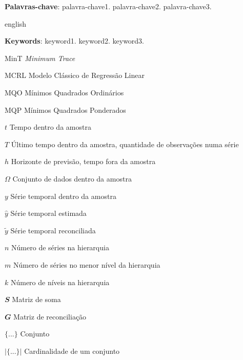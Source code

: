 
\setlength{\absparsep}{18pt}
\begin{resumo}
  \lipsum[30]

  \textbf{Palavras-chave}: palavra-chave1. palavra-chave2. palavra-chave3.
\end{resumo}

\begin{resumo}[Abstract]
  \begin{otherlanguage*}{english}
    \lipsum[30]

    \vspace{\onelineskip}
 
    \noindent 
    \textbf{Keywords}: keyword1. keyword2. keyword3.
  \end{otherlanguage*}
\end{resumo}

\listoffigures*
\cleardoublepage

\listofquadros*
\cleardoublepage

\listoftables*
\cleardoublepage

\begin{siglas}
  \item[MinT] \textit{Minimum Trace}
  \item[MCRL] Modelo Clássico de Regressão Linear
  \item[MQO] Mínimos Quadrados Ordinários
  \item[MQP] Mínimos Quadrados Ponderados
\end{siglas}

\begin{simbolos}
  \item[$ t $] Tempo dentro da amostra
  \item[$ T $] Último tempo dentro da amostra, quantidade de observações numa série
  \item[$ h $] Horizonte de previsão, tempo fora da amostra
  \item[$ \Omega $] Conjunto de dados dentro da amostra
  \item[$ y $] Série temporal dentro da amostra
  \item[$ \hat{y} $] Série temporal estimada
  \item[$ \tilde{y} $] Série temporal reconciliada
  \item[$ n $] Número de séries na hierarquia
  \item[$ m $] Número de séries no menor nível da hierarquia
  \item[$ k $] Número de níveis na hierarquia
  \item[$ \mathbfit{S} $] Matriz de soma
  \item[$ \mathbfit{G} $] Matriz de reconciliação
  \item[$\{...\}$] Conjunto
  \item[$|\{...\}|$] Cardinalidade de um conjunto
\end{simbolos}

\tableofcontents*
\cleardoublepage

\textual
